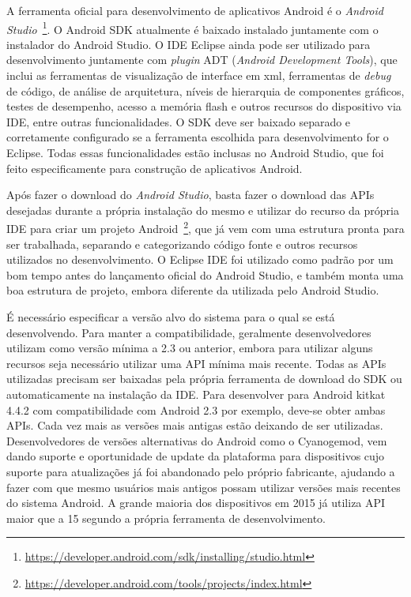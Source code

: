 A ferramenta oficial para desenvolvimento de aplicativos Android é o \textit{Android Studio}~\footnote{\url{https://developer.android.com/sdk/installing/studio.html}}. O Android SDK atualmente é baixado instalado juntamente com o instalador do Android Studio. O IDE Eclipse ainda pode ser utilizado para desenvolvimento juntamente com \textit{plugin} ADT (\textit{Android Development Tools}), que inclui as ferramentas de visualização de interface em xml, ferramentas de \textit{debug} de código, de análise de arquitetura, níveis de hierarquia de componentes gráficos, testes de desempenho, acesso a memória flash e outros recursos do dispositivo via IDE, entre outras funcionalidades.  O SDK deve ser baixado separado e corretamente configurado se a ferramenta escolhida para desenvolvimento for o Eclipse. Todas essas funcionalidades estão inclusas no Android Studio, que foi feito especificamente para construção de aplicativos Android.

Após fazer o download do \textit{Android Studio}, basta fazer o download das APIs desejadas durante a própria instalação do mesmo e utilizar do recurso da própria IDE para criar um projeto Android~\footnote{\url{https://developer.android.com/tools/projects/index.html}}, que já vem com uma estrutura pronta para ser trabalhada, separando e categorizando código fonte e outros recursos utilizados no desenvolvimento. O Eclipse IDE foi utilizado como padrão por um bom tempo antes do lançamento oficial do Android Studio, e também monta uma boa estrutura de projeto, embora diferente da utilizada pelo Android Studio.

É necessário especificar a versão alvo do sistema para o qual se está desenvolvendo. Para manter a compatibilidade, geralmente desenvolvedores utilizam como versão mínima a 2.3 ou anterior, embora para utilizar alguns recursos seja necessário utilizar uma API mínima mais recente. Todas as APIs utilizadas precisam ser baixadas pela própria ferramenta de download do SDK ou automaticamente na instalação da IDE. Para desenvolver para Android kitkat 4.4.2 com compatibilidade com Android 2.3 por exemplo, deve-se obter ambas APIs. Cada vez mais as versões mais antigas estão deixando de ser utilizadas. Desenvolvedores de versões alternativas do Android como o Cyanogemod, vem dando suporte e oportunidade de update da plataforma para dispositivos cujo suporte para atualizações já foi abandonado pelo próprio fabricante, ajudando a fazer com que mesmo usuários mais antigos possam utilizar versões mais recentes do sistema Android. A grande maioria dos dispositivos em 2015 já utiliza API maior que a 15 segundo a própria ferramenta de desenvolvimento.

